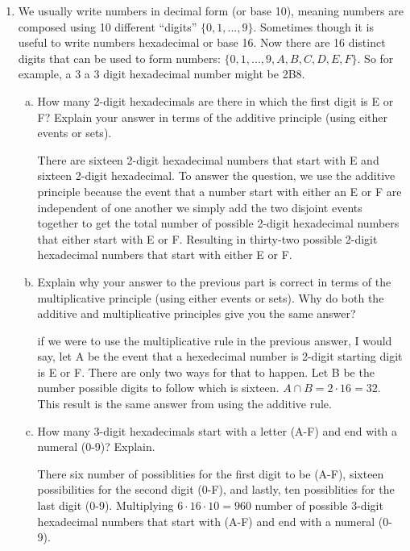 \documentclass[11pt, a4paper]{article}
\newcommand\setItemNumber[1]{\setcounter{enumi}{\numexpr#1-1\relax}}
\begin{document}
    \begin{enumerate} 
    
        \setItemNumber{4}
        \item We usually write numbers in decimal form (or base 10), meaning numbers are composed using 10 different “digits” $\{0,1,...,9\}$. Sometimes though it is useful to write numbers hexadecimal or base 16. Now there are 16 distinct digits that can be used to form numbers: $\{0,1,...,9,A,B,C,D,E,F\}$. So for example, a 3 a 3 digit hexadecimal number might be 2B8.
        \begin{enumerate}[(a)]

            \item How many 2-digit hexadecimals are there in which the first digit is E or F? Explain your answer in terms of the additive principle (using either events or sets).
            
            There are sixteen 2-digit hexadecimal numbers that start with E and sixteen 2-digit hexadecimal. To answer the question, we use the additive principle because the event that a number start with either an E or F are independent of one another we simply add the two disjoint events together to get the total number of possible 2-digit hexadecimal numbers that either start with E or F. Resulting in thirty-two possible 2-digit hexadecimal numbers that start with either E or F.

            \item Explain why your answer to the previous part is correct in terms of the multiplicative principle (using either events or sets). Why do both the additive and multiplicative principles give you the same answer?

                if we were to use the multiplicative rule in the previous answer, I would say, let A be the event that a hexedecimal number is 2-digit starting digit is E or F. There are only two ways for that to happen. Let B be the number possible digits to follow which is sixteen. $A\cap B = 2 \cdot 16 = 32$. This result is the same answer from using the additive rule.
            
            \item How many 3-digit hexadecimals start with a letter (A-F) and end with a numeral (0-9)? Explain.

                There six number of possiblities for the first digit to be (A-F), sixteen possibilities for the second digit (0-F), and lastly, ten possiblities for the last digit (0-9). Multiplying $6 \cdot 16 \cdot 10 = 960$ number of possible 3-digit hexadecimal numbers that start with (A-F) and end with a numeral (0-9). 


\end{enumerate}
\end{enumerate}
\end{document}
